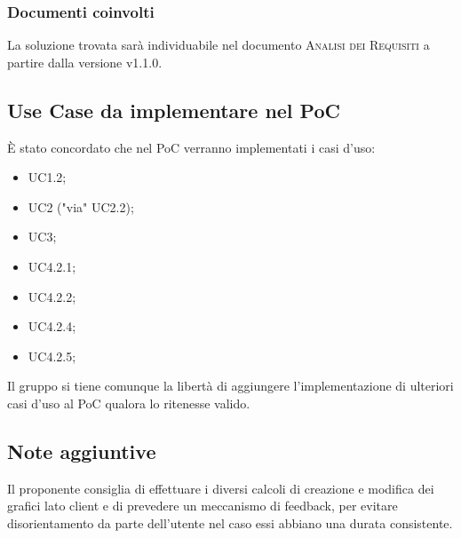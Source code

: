 \documentclass{article}
\begin{document}
\subsubsection*{Documenti coinvolti}
La soluzione trovata sar\`{a} individuabile nel documento \textsc{Analisi dei Requisiti} a partire dalla versione v1.1.0.

\subsection{Use Case da implementare nel PoC}
\label{itm:4}
\`{E} stato concordato che nel PoC verranno implementati i casi d'uso:
\begin{itemize}
	\item UC1.2;
	\item UC2 ("via" UC2.2);
	\item UC3;
	\item UC4.2.1;
	\item UC4.2.2;
	\item UC4.2.4;
	\item UC4.2.5;
\end{itemize}
Il gruppo si tiene comunque la libert\`{a} di aggiungere l'implementazione di ulteriori casi d'uso al PoC qualora lo ritenesse valido.
\subsection{Note aggiuntive}
\label{sub:note}
Il proponente consiglia di effettuare i diversi calcoli di creazione e modifica dei grafici lato client e di prevedere un meccanismo di feedback,
per evitare disorientamento da parte dell'utente nel caso essi abbiano una durata consistente.
\end{document}
